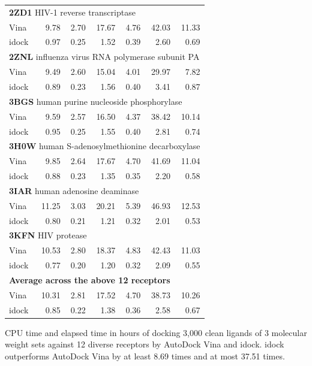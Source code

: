 \begin{table}
\begin{tabular}{lrrrrrr}
\multicolumn{7}{l}{\textbf{2ZD1} HIV-1 reverse transcriptase}\\
Vina  &  9.78 &  2.70 & 17.67 &  4.76 & 42.03 & 11.33\\
idock &  0.97 &  0.25 &  1.52 &  0.39 &  2.60 &  0.69\\
\multicolumn{7}{l}{\textbf{2ZNL} influenza virus RNA polymerase subunit PA}\\
Vina  &  9.49 &  2.60 & 15.04 &  4.01 & 29.97 &  7.82\\
idock &  0.89 &  0.23 &  1.56 &  0.40 &  3.41 &  0.87\\
\multicolumn{7}{l}{\textbf{3BGS} human purine nucleoside phosphorylase}\\
Vina  &  9.59 &  2.57 & 16.50 &  4.37 & 38.42 & 10.14\\
idock &  0.95 &  0.25 &  1.55 &  0.40 &  2.81 &  0.74\\
\multicolumn{7}{l}{\textbf{3H0W} human S-adenosylmethionine decarboxylase}\\
Vina  &  9.85 &  2.64 & 17.67 &  4.70 & 41.69 & 11.04\\
idock &  0.88 &  0.23 &  1.35 &  0.35 &  2.20 &  0.58\\
\multicolumn{7}{l}{\textbf{3IAR} human adenosine deaminase}\\
Vina  & 11.25 &  3.03 & 20.21 &  5.39 & 46.93 & 12.53\\
idock &  0.80 &  0.21 &  1.21 &  0.32 &  2.01 &  0.53\\
\multicolumn{7}{l}{\textbf{3KFN} HIV protease}\\
Vina  & 10.53 &  2.80 & 18.37 &  4.83 & 42.43 & 11.03\\
idock &  0.77 &  0.20 &  1.20 &  0.32 &  2.09 &  0.55\\
\multicolumn{7}{l}{\textbf{Average across the above 12 receptors}}\\
Vina  & 10.31 &  2.81 & 17.52 &  4.70 & 38.73 & 10.26\\
idock &  0.85 &  0.22 &  1.38 &  0.36 &  2.58 &  0.67\\
\end{tabular}
\begin{flushleft}
\label{ExecutionTime} CPU time and elapsed time in hours of docking 3,000 clean ligands of 3 molecular weight sets against 12 diverse receptors by AutoDock Vina and idock. idock outperforms AutoDock Vina by at least 8.69 times and at most 37.51 times.
\end{flushleft}
\end{table}

